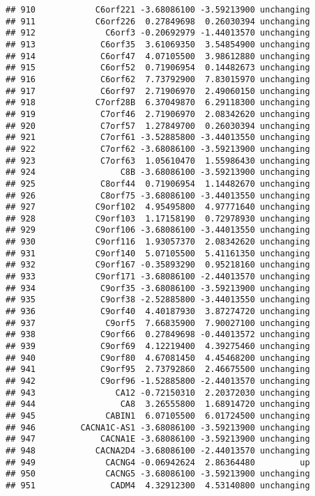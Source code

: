 \documentclass[]{article}
\begin{document}
\begin{verbatim}
## 910            C6orf221 -3.68086100 -3.59213900 unchanging
## 911            C6orf226  0.27849698  0.26030394 unchanging
## 912              C6orf3 -0.20692979 -1.44013570 unchanging
## 913             C6orf35  3.61069350  3.54854900 unchanging
## 914             C6orf47  4.07105500  3.98612880 unchanging
## 915             C6orf52  0.71906954  0.14482673 unchanging
## 916             C6orf62  7.73792900  7.83015970 unchanging
## 917             C6orf97  2.71906970  2.49060150 unchanging
## 918            C7orf28B  6.37049870  6.29118300 unchanging
## 919             C7orf46  2.71906970  2.08342620 unchanging
## 920             C7orf57  1.27849700  0.26030394 unchanging
## 921             C7orf61 -3.52885800 -3.44013550 unchanging
## 922             C7orf62 -3.68086100 -3.59213900 unchanging
## 923             C7orf63  1.05610470  1.55986430 unchanging
## 924                 C8B -3.68086100 -3.59213900 unchanging
## 925             C8orf44  0.71906954  1.14482670 unchanging
## 926             C8orf75 -3.68086100 -3.44013550 unchanging
## 927            C9orf102  4.95495800  4.97771640 unchanging
## 928            C9orf103  1.17158190  0.72978930 unchanging
## 929            C9orf106 -3.68086100 -3.44013550 unchanging
## 930            C9orf116  1.93057370  2.08342620 unchanging
## 931            C9orf140  5.07105500  5.41161350 unchanging
## 932            C9orf167 -0.35893290  0.95218160 unchanging
## 933            C9orf171 -3.68086100 -2.44013570 unchanging
## 934             C9orf35 -3.68086100 -3.59213900 unchanging
## 935             C9orf38 -2.52885800 -3.44013550 unchanging
## 936             C9orf40  4.40187930  3.87274720 unchanging
## 937              C9orf5  7.66835900  7.90027100 unchanging
## 938             C9orf66  0.27849698 -0.44013572 unchanging
## 939             C9orf69  4.12219400  4.39275460 unchanging
## 940             C9orf80  4.67081450  4.45468200 unchanging
## 941             C9orf95  2.73792860  2.46675500 unchanging
## 942             C9orf96 -1.52885800 -2.44013570 unchanging
## 943                CA12 -0.72150310  2.20372030 unchanging
## 944                 CA8  3.26555800  1.68914720 unchanging
## 945              CABIN1  6.07105500  6.01724500 unchanging
## 946         CACNA1C-AS1 -3.68086100 -3.59213900 unchanging
## 947             CACNA1E -3.68086100 -3.59213900 unchanging
## 948            CACNA2D4 -3.68086100 -2.44013570 unchanging
## 949              CACNG4 -0.06942624  2.86364480         up
## 950              CACNG5 -3.68086100 -3.59213900 unchanging
## 951               CADM4  4.32912300  4.53140800 unchanging

\end{verbatim}
\end{document}
